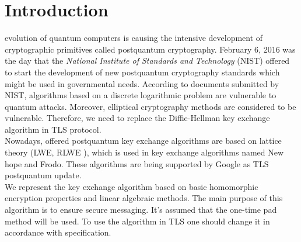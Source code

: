 \section{Introduction}
	\IEEEoverridecommandlockouts{} evolution of quantum computers is causing the intensive development of cryptographic primitives called postquantum cryptography. February 6, 2016 was the day that the \textit{National Institute of Standards and Technology} (NIST) offered to start the development of new postquantum cryptography standards which might be used in governmental needs. According to documents submitted by NIST, algorithms based on a discrete logarithmic problem are vulnerable to quantum attacks. Moreover, elliptical cryptography methods are considered to be vulnerable. Therefore, we need to replace the Diffie-Hellman key exchange algorithm in TLS protocol. \\ 
Nowadays, offered postquantum key exchange algorithms are based on lattice theory \cite{Peikert2014} (LWE, RLWE \cite{7163047}), which is used in key exchange algorithms named New hope\cite{cryptoeprint:2015:1092} and Frodo\cite{cryptoeprint:2016:659}. These algorithms are being supported by Google as TLS postquantum update. \\
We represent the key exchange algorithm based on basic homomorphic encryption properties and linear algebraic methods. The main purpose of this algorithm is to ensure secure messaging. It's assumed that the one-time pad method will be used. To use the algorithm in TLS one should change it in accordance with specification.
